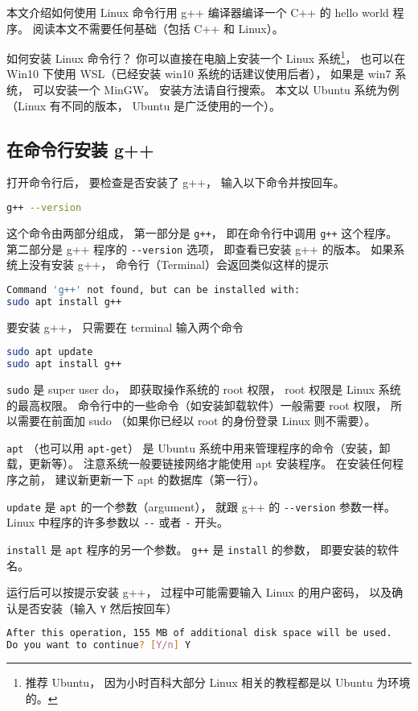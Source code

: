 
本文介绍如何使用 Linux 命令行用 g++ 编译器编译一个 C++ 的 hello world 程序。 阅读本文不需要任何基础（包括 C++ 和 Linux）。

如何安装 Linux 命令行？ 你可以直接在电脑上安装一个 Linux 系统\footnote{推荐 Ubuntu， 因为小时百科大部分 Linux 相关的教程都是以 Ubuntu 为环境的。}， 也可以在 Win10 下使用 WSL（已经安装 win10 系统的话建议使用后者）， 如果是 win7 系统， 可以安装一个 MinGW。 安装方法请自行搜索。 本文以 Ubuntu 系统为例（Linux 有不同的版本， Ubuntu 是广泛使用的一个）。

\subsection{在命令行安装 g++}
打开命令行后， 要检查是否安装了 g++， 输入以下命令并按回车。
\begin{lstlisting}[language=bash]
g++ --version
\end{lstlisting}
这个命令由两部分组成， 第一部分是 \verb|g++|， 即在命令行中调用 \verb|g++| 这个程序。 第二部分是 g++ 程序的 \verb|--version| 选项， 即查看已安装 g++ 的版本。 如果系统上没有安装 g++， 命令行（Terminal）会返回类似这样的提示
\begin{lstlisting}[language=bash]
Command 'g++' not found, but can be installed with:
sudo apt install g++
\end{lstlisting}
要安装 g++， 只需要在 terminal 输入两个命令
\begin{lstlisting}[language=bash]
sudo apt update
sudo apt install g++
\end{lstlisting}
\verb|sudo| 是 super user do， 即获取操作系统的 root 权限， root 权限是 Linux 系统的最高权限。 命令行中的一些命令（如安装卸载软件）一般需要 root 权限， 所以需要在前面加 sudo （如果你已经以 root 的身份登录 Linux 则不需要）。

\verb|apt| （也可以用 \verb|apt-get|） 是 Ubuntu 系统中用来管理程序的命令（安装，卸载，更新等）。 注意系统一般要链接网络才能使用 apt 安装程序。 在安装任何程序之前， 建议新更新一下 apt 的数据库（第一行）。

\verb|update| 是 \verb|apt| 的一个参数（argument）， 就跟 g++ 的 \verb|--version| 参数一样。 Linux 中程序的许多参数以 \verb|--| 或者 \verb|-| 开头。

\verb|install| 是 \verb|apt| 程序的另一个参数。 \verb|g++| 是 \verb|install| 的参数， 即要安装的软件名。

运行后可以按提示安装 g++， 过程中可能需要输入 Linux 的用户密码， 以及确认是否安装（输入 \verb|Y| 然后按回车）
\begin{lstlisting}[language=bash]
After this operation, 155 MB of additional disk space will be used.
Do you want to continue? [Y/n] Y
\end{lstlisting}

